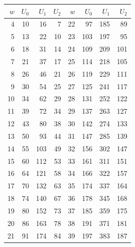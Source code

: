 \begin{tabular}{rrrr@{\qquad}rrrr}
\toprule
$w$ & $U_0$ & $U_1$ & $U_2$ & $w$ & $U_0$ & $U_1$ & $U_2$ \\
\midrule
4 & 10 & 16 & 7 & 22 & 97 & 185 & 89 \\
5 & 13 & 22 & 10 & 23 & 103 & 197 & 95 \\
6 & 18 & 31 & 14 & 24 & 109 & 209 & 101 \\
7 & 21 & 37 & 17 & 25 & 114 & 218 & 105 \\
8 & 26 & 46 & 21 & 26 & 119 & 229 & 111 \\
9 & 30 & 54 & 25 & 27 & 125 & 241 & 117 \\
10 & 34 & 62 & 29 & 28 & 131 & 252 & 122 \\
11 & 39 & 72 & 34 & 29 & 137 & 263 & 127 \\
12 & 43 & 80 & 38 & 30 & 142 & 274 & 133 \\
13 & 50 & 93 & 44 & 31 & 147 & 285 & 139 \\
14 & 55 & 103 & 49 & 32 & 156 & 302 & 147 \\
15 & 60 & 112 & 53 & 33 & 161 & 311 & 151 \\
16 & 64 & 121 & 58 & 34 & 166 & 322 & 157 \\
17 & 70 & 132 & 63 & 35 & 174 & 337 & 164 \\
18 & 74 & 140 & 67 & 36 & 178 & 345 & 168 \\
19 & 80 & 152 & 73 & 37 & 185 & 359 & 175 \\
20 & 86 & 163 & 78 & 38 & 191 & 371 & 181 \\
21 & 91 & 174 & 84 & 39 & 197 & 383 & 187 \\
\bottomrule
\end{tabular}
